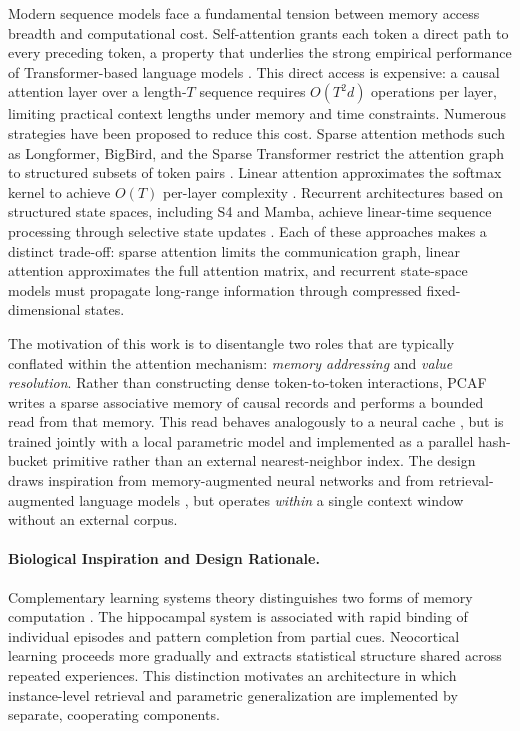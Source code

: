 \documentclass[11pt]{article}
\begin{document}
Modern sequence models face a fundamental tension between memory access breadth
and computational cost. Self-attention grants each token a direct path to every
preceding token, a property that underlies the strong empirical performance of
Transformer-based language models
\citep{vaswani2017attention,bahdanau2015attention}. This direct access is
expensive: a causal attention layer over a length-$T$ sequence requires
$O(T^2 d)$ operations per layer, limiting practical context lengths under
memory and time constraints. Numerous strategies have been proposed to reduce
this cost. Sparse attention methods such as Longformer, BigBird, and the Sparse
Transformer restrict the attention graph to structured subsets of token pairs
\citep{beltagy2020longformer,zaheer2020bigbird,child2019sparsetransformer}.
Linear attention approximates the softmax kernel to achieve $O(T)$ per-layer
complexity \citep{katharopoulos2020linearattn}. Recurrent architectures based
on structured state spaces, including S4 and Mamba, achieve linear-time
sequence processing through selective state updates
\citep{gu2021s4,gu2023mamba}. Each of these approaches makes a distinct
trade-off: sparse attention limits the communication graph, linear attention
approximates the full attention matrix, and recurrent state-space models must
propagate long-range information through compressed fixed-dimensional states.

The motivation of this work is to disentangle two roles that are typically
conflated within the attention mechanism: \emph{memory addressing} and
\emph{value resolution}. Rather than constructing dense token-to-token
interactions, PCAF writes a sparse associative memory of causal records and
performs a bounded read from that memory. This read behaves analogously to a
neural cache \citep{grave2016continuous,khandelwal2019knn}, but is trained
jointly with a local parametric model and implemented as a parallel hash-bucket
primitive rather than an external nearest-neighbor index. The design draws
inspiration from memory-augmented neural networks
\citep{weston2015memory,sukhbaatar2015end2end} and from retrieval-augmented
language models \citep{borgeaud2022retro,izacard2022atlas}, but operates
\emph{within} a single context window without an external corpus.

\paragraph{Biological Inspiration and Design Rationale.}
Complementary learning systems theory distinguishes two forms of memory
computation \citep{mcclelland1995complementary,kumaran2016learning}. The
hippocampal system is associated with rapid binding of individual episodes and
pattern completion from partial cues. Neocortical learning proceeds more
gradually and extracts statistical structure shared across repeated
experiences. This distinction motivates an architecture in which instance-level
retrieval and parametric generalization are implemented by separate,
cooperating components.
\end{document}
